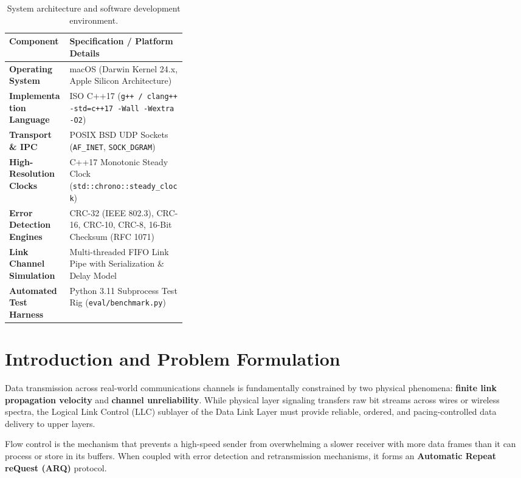 \documentclass[11pt,a4paper]{article}
\begin{document}
\begin{table}[H]
\centering
\small
\begin{tabularx}{\linewidth}{@{}>{\bfseries}p{0.34\linewidth} X@{}}
\toprule
Component & Specification / Platform Details \\
\midrule
Operating System & macOS (Darwin Kernel 24.x, Apple Silicon Architecture) \\
Implementation Language & ISO C++17 (\texttt{g++ / clang++ -std=c++17 -Wall -Wextra -O2}) \\
Transport \& IPC & POSIX BSD UDP Sockets (\texttt{AF\_INET}, \texttt{SOCK\_DGRAM}) \\
High-Resolution Clocks & C++17 Monotonic Steady Clock (\texttt{std::chrono::steady\_clock}) \\
Error Detection Engines & CRC-32 (IEEE 802.3), CRC-16, CRC-10, CRC-8, 16-Bit Checksum (RFC 1071) \\
Link Channel Simulation & Multi-threaded FIFO Link Pipe with Serialization \& Delay Model \\
Automated Test Harness & Python 3.11 Subprocess Test Rig (\texttt{eval/benchmark.py}) \\
\bottomrule
\end{tabularx}
\caption{System architecture and software development environment.}
\label{tab:sysconfig}
\end{table}

\FloatBarrier
\section{Introduction and Problem Formulation}

Data transmission across real-world communications channels is fundamentally constrained by two physical phenomena: \textbf{finite link propagation velocity} and \textbf{channel unreliability}. While physical layer signaling transfers raw bit streams across wires or wireless spectra, the Logical Link Control (LLC) sublayer of the Data Link Layer must provide reliable, ordered, and pacing-controlled data delivery to upper layers.

Flow control is the mechanism that prevents a high-speed sender from overwhelming a slower receiver with more data frames than it can process or store in its buffers. When coupled with error detection and retransmission mechanisms, it forms an \textbf{Automatic Repeat reQuest (ARQ)} protocol.
\end{document}
